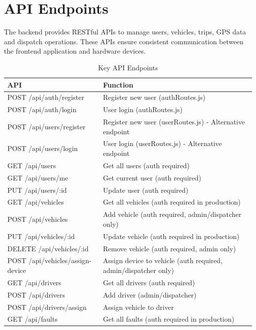 \section{API Endpoints}
The backend provides RESTful APIs to manage users, vehicles, trips, GPS data and dispatch operations. These APIs ensure consistent communication between the frontend application and hardware devices.

\begin{table}[H]
    \centering
    \caption{Key API Endpoints}
    \label{tab:5.3}
    \begin{tabular}{>{\raggedright\arraybackslash}p{6cm}>{\raggedright\arraybackslash}p{8cm}}
        \toprule
        \textbf{API} & \textbf{Function} \\
        \midrule
        POST /api/auth/register & Register new user (authRoutes.js) \\
        POST /api/auth/login & User login (authRoutes.js) \\
        POST /api/users/register & Register new user (userRoutes.js) - Alternative endpoint \\
        POST /api/users/login & User login (userRoutes.js) - Alternative endpoint \\
        GET /api/users & Get all users (auth required) \\
        GET /api/users/me & Get current user (auth required) \\
        PUT /api/users/:id & Update user (auth required) \\
        GET /api/vehicles & Get all vehicles (auth required in production) \\
        POST /api/vehicles & Add vehicle (auth required, admin/dispatcher only) \\
        PUT /api/vehicles/:id & Update vehicle (auth required in production) \\
        DELETE /api/vehicles/:id & Remove vehicle (auth required, admin only) \\
        POST /api/vehicles/assign-device & Assign device to vehicle (auth required, admin/dispatcher only) \\
        GET /api/drivers & Get all drivers (auth required) \\
        POST /api/drivers & Add driver (admin/dispatcher) \\
        POST /api/drivers/assign & Assign vehicle to driver \\
        GET /api/faults & Get all faults (auth required in production) \\

\end{tabular}
\end{table}
